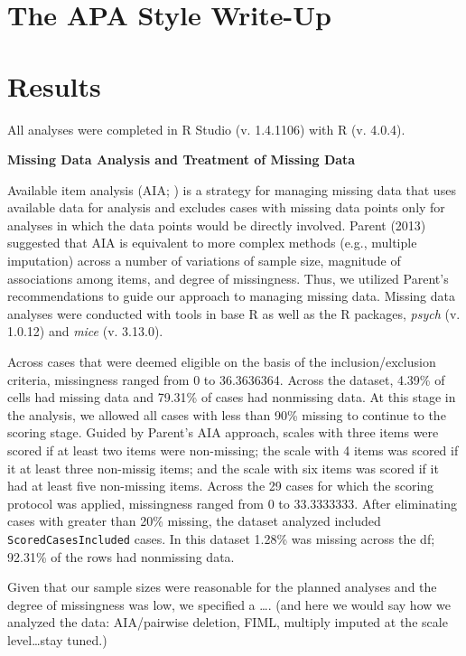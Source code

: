 \documentclass[
  english,
]{book}
\begin{document}
\hypertarget{the-apa-style-write-up}{%
\section{The APA Style Write-Up}\label{the-apa-style-write-up}}

\hypertarget{results}{%
\section{Results}\label{results}}

All analyses were completed in R Studio (v. 1.4.1106) with R (v. 4.0.4).

\textbf{Missing Data Analysis and Treatment of Missing Data}

Available item analysis (AIA; \citep{parent_handling_2013}) is a strategy for managing missing data that uses available data for analysis and excludes cases with missing data points only for analyses in which the data points would be directly involved. Parent (2013) suggested that AIA is equivalent to more complex methods (e.g., multiple imputation) across a number of variations of sample size, magnitude of associations among items, and degree of missingness. Thus, we utilized Parent's recommendations to guide our approach to managing missing data. Missing data analyses were conducted with tools in base R as well as the R packages, \emph{psych} (v. 1.0.12) and \emph{mice} (v. 3.13.0).

Across cases that were deemed eligible on the basis of the inclusion/exclusion criteria, missingness ranged from 0 to 36.3636364. Across the dataset, 4.39\% of cells had missing data and 79.31\% of cases had nonmissing data. At this stage in the analysis, we allowed all cases with less than 90\% missing to continue to the scoring stage. Guided by Parent's \citeyearpar{parent_handling_2013} AIA approach, scales with three items were scored if at least two items were non-missing; the scale with 4 items was scored if it at least three non-missig items; and the scale with six items was scored if it had at least five non-missing items. Across the 29 cases for which the scoring protocol was applied, missingness ranged from 0 to 33.3333333. After eliminating cases with greater than 20\% missing, the dataset analyzed included \texttt{ScoredCasesIncluded} cases. In this dataset 1.28\% was missing across the df; 92.31\% of the rows had nonmissing data.

Given that our sample sizes were reasonable for the planned analyses and the degree of missingness was low, we specified a \ldots. (and here we would say how we analyzed the data: AIA/pairwise deletion, FIML, multiply imputed at the scale level\ldots stay tuned.)
\end{document}
